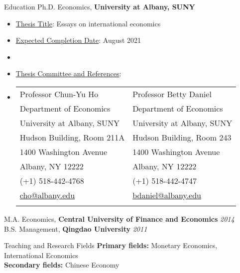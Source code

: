 \documentclass{resume_liang} %
\begin{document}
\begin{rSection}{Education}
Ph.D. Economics, {\bf University at Albany, SUNY}                     
  \begin{itemize}
  	\item[] \underline{Thesis Title}: Essays on international economics 
  	\item[] \underline{Expected Completion Date}: August 2021
  	\item[]
  	\item[] \underline{Thesis Committee and References}:
  	\item[] \begin{tabular}{ll}
  		 Professor Chun-Yu Ho  & Professor Betty Daniel  \\ 
  		 Department of Economics &  Department of Economics  \\
  		 University at Albany, SUNY & University at Albany, SUNY   \\
  		 Hudson Building, Room 211A & Hudson Building, Room 243   \\
  		 1400 Washington Avenue & 1400 Washington Avenue   \\
  		 Albany, NY 12222 & Albany, NY 12222    \\
  		 (+1) 518-442-4768 &  (+1) 518-442-4747   \\
  		 \href{mailto:cho@albany.edu}{cho@albany.edu} & \href{mailto:bdaniel@albany.edu}{bdaniel@albany.edu}   \\
  		 \\
  	\end{tabular}
  \end{itemize}
M.A. Economics, {\bf Central University of Finance and Economics}    \hfill {\em 2014} \\
B.S. Management, {\bf Qingdao University}                            \hfill {\em 2011} \\
\end{rSection}
\bigskip \bigskip







\begin{rSection}{Teaching and Research Fields}
{\bf Primary fields:} Monetary Economics, International Economics \\ 
{\bf Secondary fields:} Chinese Economy  \\
\end{rSection}
\bigskip \bigskip
\end{document}
